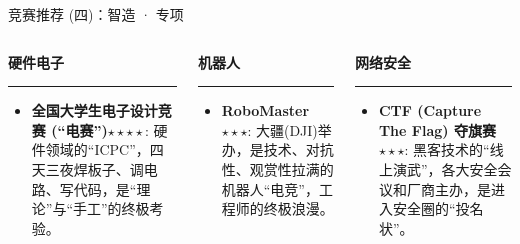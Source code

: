 \documentclass{beamer}
\begin{document}
\begin{frame}{竞赛推荐 (四)：智造 · 专项}
    \begin{columns}[T]
        \begin{column}{0.33\textwidth}
            \begin{center}
                \Large\textbf{硬件电子} \\
                \rule{\linewidth}{0.4pt}
            \end{center}
            \begin{itemize}
                \item \textbf{全国大学生电子设计竞赛 (“电赛”)$\star \star \star \star$}: \small 硬件领域的“ICPC”，四天三夜焊板子、调电路、写代码，是“理论”与“手工”的终极考验。
            \end{itemize}
        \end{column}
        
        \begin{column}{0.33\textwidth}
            \begin{center}
                \Large\textbf{机器人} \\
                \rule{\linewidth}{0.4pt}
            \end{center}
            \begin{itemize}
                \item \textbf{RoboMaster $\star \star \star $}: \small 大疆(DJI)举办，是技术、对抗性、观赏性拉满的机器人“电竞”，工程师的终极浪漫。
            \end{itemize}
        \end{column}
        
        \begin{column}{0.33\textwidth}
            \begin{center}
                \Large\textbf{网络安全} \\
                \rule{\linewidth}{0.4pt}
            \end{center}
            \begin{itemize}
                \item \textbf{CTF (Capture The Flag) 夺旗赛 $\star \star \star$}: \small 黑客技术的“线上演武”，各大安全会议和厂商主办，是进入安全圈的“投名状”。
            \end{itemize}
        \end{column}
    \end{columns}
\end{frame}
\end{document}
